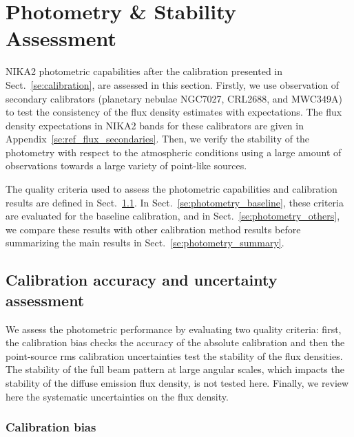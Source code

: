 \documentclass[traditionalabstract]{aa}
\newcommand{\lp}[1]{#1}
\newcommand{\rev}[1]{#1}
\begin{document}
\section{Photometry \& Stability Assessment}
\label{se:photometry}
%

NIKA2 photometric capabilities after the calibration presented in
Sect.~\ref{se:calibration}, are assessed in this section. Firstly,
we use observation of secondary calibrators (planetary nebulae NGC7027, CRL2688, and
MWC349A) to test the consistency of the flux density estimates with
expectations. The flux density expectations
in NIKA2 bands for these calibrators are given in
Appendix~\ref{se:ref_flux_secondaries}. Then,
we verify the stability of the photometry with
respect to the atmospheric conditions using a large amount of
observations towards a large variety of {\rev point-like}
sources. 

The quality criteria used to assess the photometric capabilities and
calibration results are defined in Sect.~\ref{se:photometry_criteria}.
In Sect.~\ref{se:photometry_baseline}, these criteria are evaluated
for the baseline calibration, and in Sect.~\ref{se:photometry_others},
we compare these results with other calibration method results before
summarizing the main results in Sect.~\ref{se:photometry_summary}. 


\subsection{Calibration accuracy and uncertainty assessment}
\label{se:photometry_criteria}

We assess the photometric performance by evaluating two
quality criteria: first, the calibration bias checks the accuracy of
the absolute calibration and then the {\rev point-source} rms
calibration uncertainties test the stability of the flux
densities. {\rev The stability of the full beam pattern at large
angular scales, which impacts the stability of the diffuse emission
flux density, is not tested here}. {\lp Finally, we review here the
systematic uncertainties on the flux density.}


\subsubsection{Calibration bias}
\label{se:def_calibration_bias}
\end{document}
